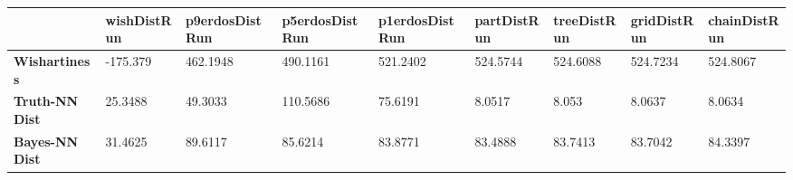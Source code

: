 \begin{tabular}{|l|l|l|l|l|l|l|l|l|}
\hline
&\textbf{wishDistRun}&\textbf{p9erdosDistRun}&\textbf{p5erdosDistRun}&\textbf{p1erdosDistRun}&\textbf{partDistRun}&\textbf{treeDistRun}&\textbf{gridDistRun}&\textbf{chainDistRun}\\\hline
\textbf{Wishartiness}&-175.379&462.1948&490.1161&521.2402&524.5744&524.6088&524.7234&524.8067\\\hline
\textbf{Truth-NN Dist}&25.3488&49.3033&110.5686&75.6191&8.0517&8.053&8.0637&8.0634\\\hline
\textbf{Bayes-NN Dist}&31.4625&89.6117&85.6214&83.8771&83.4888&83.7413&83.7042&84.3397\\\hline
\end{tabular}
